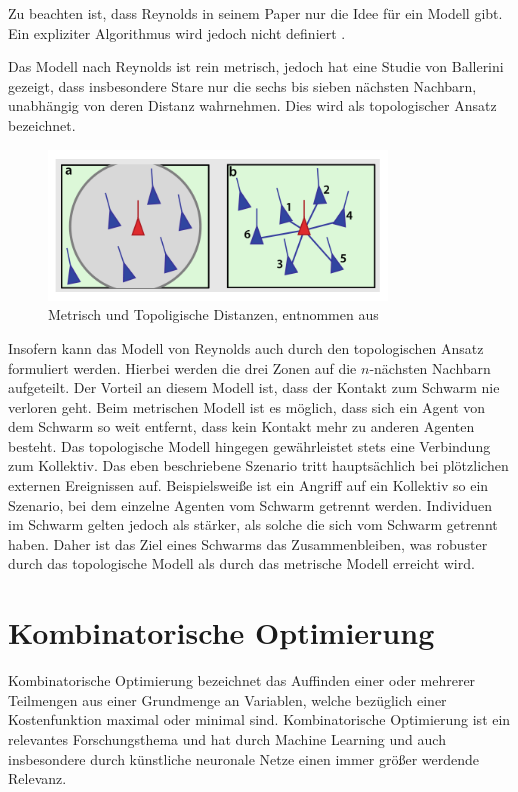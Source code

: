 Zu beachten ist, dass Reynolds in seinem Paper nur die Idee für ein Modell gibt. Ein expliziter Algorithmus wird jedoch nicht definiert \citet{reynolds1987}.


Das Modell nach Reynolds ist rein metrisch, jedoch hat eine Studie von Ballerini \citet{Ballerini} gezeigt, dass insbesondere Stare nur die sechs bis sieben nächsten Nachbarn, unabhängig von deren Distanz wahrnehmen.
Dies wird als topologischer Ansatz bezeichnet.

\begin{figure}[h]
\centering
\includegraphics[width=90mm]{figures/Grundlagen/TopologischVSMetrisch.png}
\caption{Metrisch und Topoligische Distanzen, \label{fig:Dist} entnommen aus \citep{Hamann}}
\end{figure}

Insofern kann das Modell von Reynolds auch durch den topologischen Ansatz formuliert werden.
Hierbei werden die drei Zonen auf die $n$-nächsten Nachbarn aufgeteilt. Der Vorteil an diesem Modell ist, dass der Kontakt zum Schwarm nie verloren geht. Beim metrischen Modell ist es möglich, dass sich ein Agent von dem Schwarm so weit entfernt, dass kein Kontakt mehr zu anderen Agenten besteht. Das topologische Modell hingegen gewährleistet stets eine Verbindung zum Kollektiv. Das eben beschriebene Szenario tritt hauptsächlich bei plötzlichen externen Ereignissen auf. Beispielsweiße ist ein Angriff auf ein Kollektiv so ein Szenario, bei dem einzelne Agenten vom Schwarm getrennt werden. Individuen im Schwarm gelten jedoch als stärker, als solche die sich vom Schwarm getrennt haben. Daher ist das Ziel eines Schwarms das Zusammenbleiben, was robuster durch das topologische Modell als durch das metrische Modell erreicht wird.



\section{Kombinatorische Optimierung}


Kombinatorische Optimierung bezeichnet das Auffinden einer oder mehrerer Teilmengen aus einer Grundmenge an Variablen, welche bezüglich einer Kostenfunktion maximal oder minimal sind. Kombinatorische Optimierung ist ein relevantes Forschungsthema und hat durch Machine Learning und auch insbesondere durch künstliche neuronale Netze einen immer größer werdende Relevanz.
\citet{Agarwal2019P.K}

